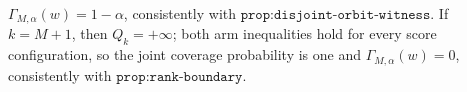 \(\Gamma_{M,\alpha}(w)=1-\alpha\), consistently with \(\texttt{prop:disjoint-orbit-witness}\). If \(k=M+1\), then \(Q_k=+\infty\); both arm inequalities hold for every score configuration, so the joint coverage probability is one and \(\Gamma_{M,\alpha}(w)=0\), consistently with \(\texttt{prop:rank-boundary}\).